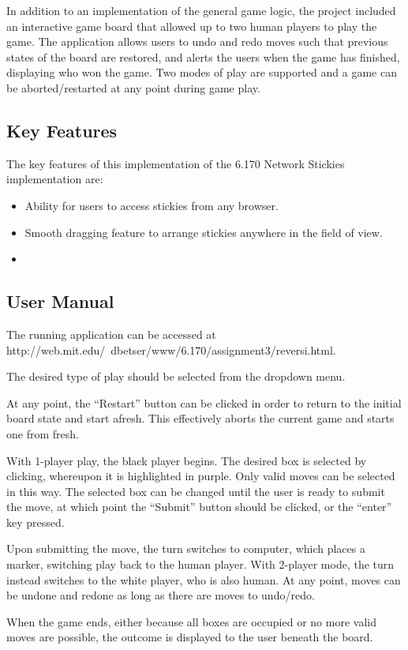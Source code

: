 \documentclass[11pt,letterpaper]{article}
\begin{document}
In addition to an implementation of the general game logic, the project included an interactive game board that allowed up to two human players to play the game. The application allows users to undo and redo moves such that previous states of the board are restored, and alerts the users when the game has finished, displaying who won the game. Two modes of play are supported and a game can be aborted/restarted at any point during game play.

\subsection{Key Features}
The key features of this implementation of the 6.170 Network Stickies implementation are:
\begin{itemize}
\item Ability for users to access stickies from any browser.
\item Smooth dragging feature to arrange stickies anywhere in the field of view.
\item 
\end{itemize}

\subsection{User Manual}
The running application can be accessed at http://web.mit.edu/~dbetser/www/6.170/assignment3/reversi.html.

The desired type of play should be selected from the dropdown menu.

At any point, the ``Restart'' button can be clicked in order to return to the initial board state and start afresh. This effectively aborts the current game and starts one from fresh.

With 1-player play, the black player begins. The desired box is selected by clicking, whereupon it is highlighted in purple. Only valid moves can be selected in this way. The selected box can be changed until the user is ready to submit the move, at which point the ``Submit'' button should be clicked, or the ``enter'' key pressed.

Upon submitting the move, the turn switches to computer, which places a marker, switching play back to the human player. With 2-player mode, the turn instead switches to the white player, who is also human. At any point, moves can be undone and redone as long as there are moves to undo/redo.

When the game ends, either because all boxes are occupied or no more valid moves are possible, the outcome is displayed to the user beneath the board.
\end{document}
